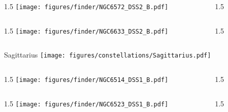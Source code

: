 \documentclass[final]{beamer}
\newlength{\colwidth}
\begin{document}

\begin{frame}[t]{}
    \begin{columns}[T]
        \begin{column}{1.5\colwidth}
            \centering
            \texttt{[image: figures/finder/NGC6572\_DSS2\_B.pdf]}
        \end{column}
        \begin{column}{1.5\colwidth}
            \Large
            
        \end{column}
    \end{columns}
    \vspace{\fill}
    \begin{columns}[T]
        \begin{column}{1.5\colwidth}
            \centering
            \texttt{[image: figures/finder/NGC6633\_DSS2\_B.pdf]}
        \end{column}
        \begin{column}{1.5\colwidth}
            \Large
            
        \end{column}
    \end{columns}
\end{frame}


\begin{frame}[t]{\LARGE Sagittarius}
    \centering
    \texttt{[image: figures/constellations/Sagittarius.pdf]}
\end{frame}


\begin{frame}[t]{}
    \begin{columns}[T]
        \begin{column}{1.5\colwidth}
            \centering
            \texttt{[image: figures/finder/NGC6514\_DSS1\_B.pdf]}
        \end{column}
        \begin{column}{1.5\colwidth}
            \Large
            
        \end{column}
    \end{columns}
    \vspace{\fill}
    \begin{columns}[T]
        \begin{column}{1.5\colwidth}
            \centering
            \texttt{[image: figures/finder/NGC6523\_DSS1\_B.pdf]}
        \end{column}
        \begin{column}{1.5\colwidth}
            \Large
            
        \end{column}
    \end{columns}
\end{frame}
\end{document}
